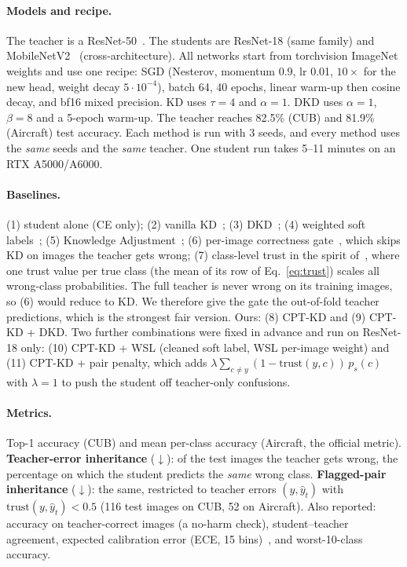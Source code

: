 \documentclass[10pt,twocolumn,letterpaper]{article}
\newcommand{\trust}{\mathrm{trust}}
\begin{document}
\paragraph{Models and recipe.} The teacher is a ResNet-50~\cite{he2016resnet}. The students are ResNet-18 (same family) and MobileNetV2~\cite{sandler2018mobilenetv2} (cross-architecture). All networks start from torchvision ImageNet weights and use one recipe: SGD (Nesterov, momentum 0.9, lr 0.01, $10\times$ for the new head, weight decay $5\cdot10^{-4}$), batch 64, 40 epochs, linear warm-up then cosine decay, and bf16 mixed precision. KD uses $\tau{=}4$ and $\alpha{=}1$. DKD uses $\alpha{=}1$, $\beta{=}8$ and a 5-epoch warm-up. The teacher reaches 82.5\% (CUB) and 81.9\% (Aircraft) test accuracy. Each method is run with 3 seeds, and every method uses the \emph{same} seeds and the \emph{same} teacher. One student run takes 5--11 minutes on an RTX A5000/A6000.

\paragraph{Baselines.} (1) student alone (CE only); (2) vanilla KD~\cite{hinton2015distilling}; (3) DKD~\cite{zhao2022dkd}; (4) weighted soft labels~\cite{zhou2021wsl}; (5) Knowledge Adjustment~\cite{wen2021preparing}; (6) per-image correctness gate~\cite{mishra2026correctness}, which skips KD on images the teacher gets wrong; (7) class-level trust in the spirit of~\cite{lukasik2022teacherspet}, where one trust value per true class (the mean of its row of Eq.~\eqref{eq:trust}) scales all wrong-class probabilities. The full teacher is never wrong on its training images, so (6) would reduce to KD. We therefore give the gate the out-of-fold teacher predictions, which is the strongest fair version. Ours: (8) CPT-KD and (9) CPT-KD + DKD. Two further combinations were fixed in advance and run on ResNet-18 only: (10) CPT-KD + WSL (cleaned soft label, WSL per-image weight) and (11) CPT-KD + pair penalty, which adds $\lambda\sum_{c\neq y}(1-\trust(y,c))\,p_s(c)$ with $\lambda{=}1$ to push the student off teacher-only confusions.

\paragraph{Metrics.} Top-1 accuracy (CUB) and mean per-class accuracy (Aircraft, the official metric). \textbf{Teacher-error inheritance} ($\downarrow$): of the test images the teacher gets wrong, the percentage on which the student predicts the \emph{same} wrong class. \textbf{Flagged-pair inheritance} ($\downarrow$): the same, restricted to teacher errors $(y,\hat y_t)$ with $\trust(y,\hat y_t)<0.5$ (116 test images on CUB, 52 on Aircraft). Also reported: accuracy on teacher-correct images (a no-harm check), student--teacher agreement, expected calibration error (ECE, 15 bins)~\cite{guo2017calibration}, and worst-10-class accuracy.
\end{document}
